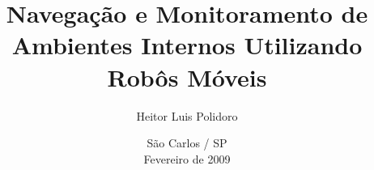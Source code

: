 \documentclass[12pt,a4paper,twoside,openright,final]{report}
\begin{document}
	
	\title{Navegação e Monitoramento de Ambientes Internos Utilizando Robôs Móveis}
	\author{Heitor Luis Polidoro}
	\date{São Carlos / SP\\Fevereiro de 2009}
	\maketitle

  \cleardoublepage
	\setcounter{page}{1}
	
%	
%	
%	
	
	\tableofcontents
	\listoffigures
	
	\cleardoublepage
	\setcounter{page}{1}
	
%	
%	
%	
%	
%	
%	
%	
%	
	
	
%	
%	 
	
%	
	
\end{document}
